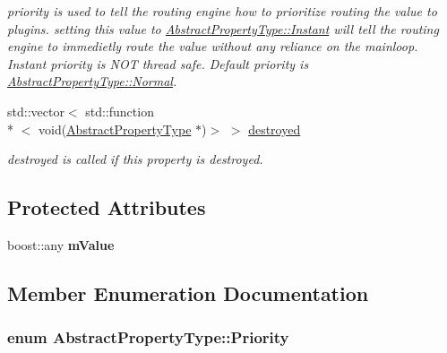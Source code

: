 \begin{DoxyCompactItemize}
\begin{DoxyCompactList}\small\item\em priority is used to tell the routing engine how to prioritize routing the value to plugins. setting this value to \hyperlink{classAbstractPropertyType_a1e513f66eb2dd2bd2cddbec16422af63a5ef5703d3d1af9d204d6d2f3cf41569a}{Abstract\-Property\-Type\-::\-Instant} will tell the routing engine to immedietly route the value without any reliance on the mainloop. Instant priority is N\-O\-T thread safe. Default priority is \hyperlink{classAbstractPropertyType_a1e513f66eb2dd2bd2cddbec16422af63a3412bc77a6a781fb4a832059f1fe5d9a}{Abstract\-Property\-Type\-::\-Normal}. \end{DoxyCompactList}\item 
\hypertarget{classAbstractPropertyType_ab557c141cce1769d0e4d8213894c9e2c}{std\-::vector$<$ std\-::function\\*
$<$ void(\hyperlink{classAbstractPropertyType}{Abstract\-Property\-Type} $\ast$)$>$ $>$ \hyperlink{classAbstractPropertyType_ab557c141cce1769d0e4d8213894c9e2c}{destroyed}}\label{classAbstractPropertyType_ab557c141cce1769d0e4d8213894c9e2c}

\begin{DoxyCompactList}\small\item\em destroyed is called if this property is destroyed. \end{DoxyCompactList}\end{DoxyCompactItemize}
\subsection*{Protected Attributes}
\begin{DoxyCompactItemize}
\item 
\hypertarget{classAbstractPropertyType_a69b5d8cd643415d4f63cd6a9e19721d9}{boost\-::any {\bfseries m\-Value}}\label{classAbstractPropertyType_a69b5d8cd643415d4f63cd6a9e19721d9}

\end{DoxyCompactItemize}


\subsection{Member Enumeration Documentation}
\hypertarget{classAbstractPropertyType_a1e513f66eb2dd2bd2cddbec16422af63}{
\subsubsection[{Priority}]{\setlength{\rightskip}{0pt plus 5cm}enum {\bf Abstract\-Property\-Type\-::\-Priority}}}\label{classAbstractPropertyType_a1e513f66eb2dd2bd2cddbec16422af63}


